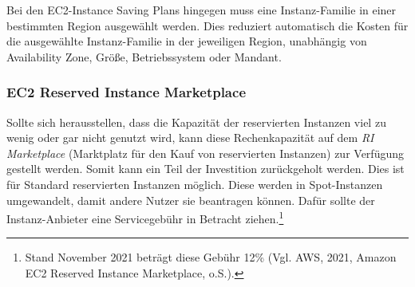Bei den EC2-Instance Saving Plans hingegen muss eine Instanz-Familie in einer bestimmten Region ausgewählt werden.  Dies reduziert automatisch die Kosten für die ausgewählte Instanz-Familie in der jeweiligen Region, unabhängig von Availability Zone, Größe, Betriebssystem oder Mandant.

\subsubsection*{EC2 Reserved Instance Marketplace}\label{sssec:RI-Marketplace}
Sollte sich herausstellen, dass die Kapazität der reservierten Instanzen viel zu wenig oder gar nicht genutzt wird, kann diese Rechenkapazität auf dem \textit{RI Marketplace} (Marktplatz für den Kauf von reservierten Instanzen) zur Verfügung gestellt werden. Somit kann ein Teil der Investition zurückgeholt werden. Dies ist für Standard reservierten Instanzen möglich. Diese werden in Spot-Instanzen umgewandelt, damit andere Nutzer sie beantragen können. Dafür sollte der Instanz-Anbieter eine Servicegebühr in Betracht ziehen.\footnote{Stand November 2021 beträgt diese Gebühr 12\% (Vgl. AWS, 2021, Amazon EC2 Reserved Instance Marketplace, o.S.\cite{AMZ23}).}

